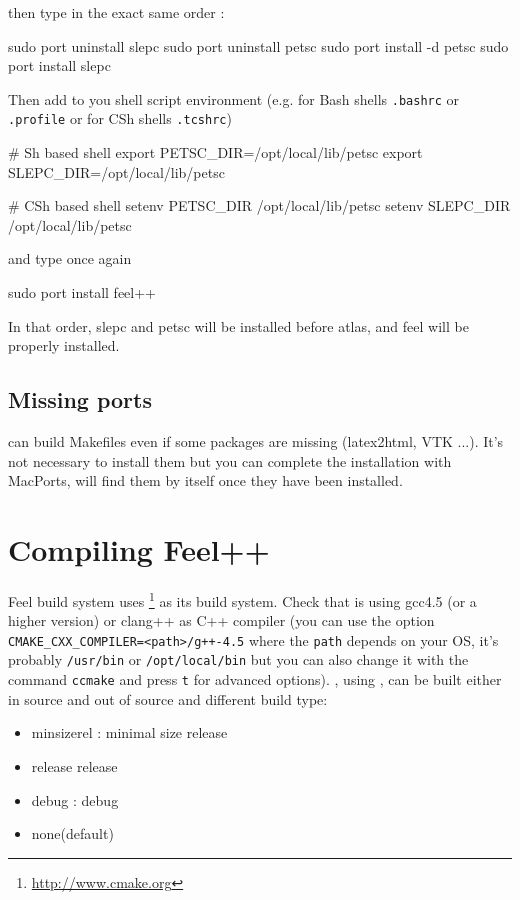 then type in the exact same order :
\begin{unixcom}
		sudo port uninstall slepc
		sudo port uninstall petsc
		sudo port install -d petsc
		sudo port install slepc
\end{unixcom}
Then add to you shell script environment (e.g. for Bash shells \lstinline|.bashrc| or
\lstinline|.profile| or for CSh shells \lstinline|.tcshrc|)
\begin{unixcom}
  # Sh based shell
  export PETSC_DIR=/opt/local/lib/petsc
  export SLEPC_DIR=/opt/local/lib/petsc

  # CSh based shell
  setenv PETSC_DIR /opt/local/lib/petsc
  setenv SLEPC_DIR /opt/local/lib/petsc
\end{unixcom}
and type once again
\begin{unixcom}
		sudo port install feel++
\end{unixcom}

\noindent In that order, slepc and petsc will be installed before atlas, and feel will be properly installed.

\subsection{Missing ports}
\cmake can build Makefiles even if some packages are missing (latex2html, VTK
...). It's not necessary to install them but you can complete the installation
with MacPorts, \cmake will find them by itself once they have been installed.

\section{Compiling Feel++}
\label{compilingfeel}
Feel build system uses \cmake{}\footnote{\url{http://www.cmake.org}}
as its build system. Check that \cmake is using gcc4.5 (or a higher version) 
or clang++ as C++ compiler
(you can use the option \lstinline|CMAKE_CXX_COMPILER=<path>/g++-4.5| where the
\lstinline|path| depends on your OS, it's probably \lstinline|/usr/bin| or
\lstinline|/opt/local/bin| but you can also change it with the command \lstinline|ccmake|
and press \lstinline|t| for advanced options).  
\feel, using \cmake, can be built either in source and out of source and different
build type:
\begin{itemize}
\item minsizerel : minimal size release
\item release release
\item debug : debug
\item none(default)
\end{itemize}

